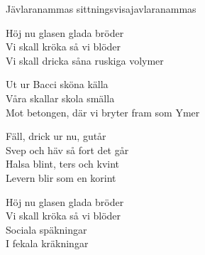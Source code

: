 \begin{song}{Jävlaranammas sittningsvisa}{javlaranammas}
\begin{vers}
Höj nu glasen glada bröder\\
Vi skall kröka så vi blöder\\
Vi skall dricka såna ruskiga volymer\\
\end{vers}
\begin{vers}
Ut ur Bacci sköna källa\\
Våra skallar skola smälla\\
Mot betongen, där vi bryter fram som Ymer\\
\end{vers}
\begin{vers}
Fäll, drick ur nu, gutår\\
Svep och häv så fort det går\\
Halsa blint, ters och kvint\\
Levern blir som en korint\\
\end{vers}
\begin{vers}
Höj nu glasen glada bröder\\
Vi skall kröka så vi blöder\\
Sociala späkningar\\
I fekala kräkningar\\
\end{vers}
\end{song}